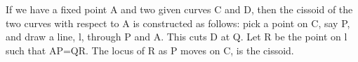 If we have a fixed point A and two given curves C and D, then the cissoid of
the two curves with respect to A is constructed as follows: pick a point on
C, say P, and draw a line, l,  through P and A. This cuts D at Q. Let R be the point
on l such that AP=QR. The locus of R as P moves on C, is the cissoid.